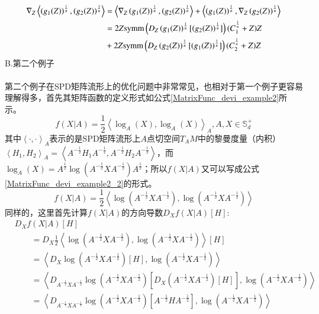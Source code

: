 \begin{equation}
\label{devi_power_metric_final}
\begin{split}
\nabla_{Z}\left<\left(g_{1}(Z)\right)^{\frac{1}{n}},\left(g_{2}(Z)\right)^{\frac{1}{n}}\right>&=\left<\nabla_{Z}\left(g_{1}(Z)\right)^{\frac{1}{n}},\left(g_{2}(Z)\right)^{\frac{1}{n}}\right>+\left<\left(g_{1}(Z)\right)^{\frac{1}{n}},\nabla_{Z}\left(g_{2}(Z)\right)^{\frac{1}{n}}\right>\\
&=2Z{\rm symm}\left(D_{Z}\left(g_{1}(Z)\right)^{\frac{1}{n}}[\left(g_{2}(Z)\right)^{\frac{1}{n}}]\right)(C_{1}^{\frac{1}{n}}+Z)Z\\
&+2Z{\rm symm}\left(D_{Z}\left(g_{2}(Z)\right)^{\frac{1}{n}}[\left(g_{1}(Z)\right)^{\frac{1}{n}}]\right)(C_{2}^{\frac{1}{n}}+Z)Z
\end{split}
\end{equation}
{\heiti B.第二个例子}\\\\
第二个例子在SPD矩阵流形上的优化问题中非常常见，也相对于第一个例子更容易理解得多，首先其矩阵函数的定义形式如公式\ref{MatrixFunc_devi_example2}所示。
\begin{equation}
\label{MatrixFunc_devi_example2}
f(X|A)=\frac{1}{2}\left<\log_{A}(X),\log_{A}(X)\right>_A,A,X\in \mathbb{S}_{d}^{+}
\end{equation}
其中$\left<\cdot,\cdot\right>_A$表示的是SPD矩阵流形上$A$点切空间$T_{A}M$中的黎曼度量（内积）$\left<H_1,H_2\right>_A=\left<A^{-\frac{1}{2}}H_1A^{-\frac{1}{2}},A^{-\frac{1}{2}}H_2A^{-\frac{1}{2}}\right>$，而$\log_A(X)=A^{\frac{1}{2}}\log(A^{-\frac{1}{2}}XA^{-\frac{1}{2}})A^{\frac{1}{2}}$；所以$f(X|A)$又可以写成公式\ref{MatrixFunc_devi_example2_2}的形式。
\begin{equation}
\label{MatrixFunc_devi_example2_2}
f(X|A)=\frac{1}{2}\left<\log(A^{-\frac{1}{2}}XA^{-\frac{1}{2}}),\log(A^{-\frac{1}{2}}XA^{-\frac{1}{2}})\right>
\end{equation}
同样的，这里首先计算$f(X|A)$的方向导数$D_{X}f(X|A)[H]$:
\begin{equation}
\label{AIM_CrossTerm_direction_devi}
\begin{split}
&D_{X}f(X|A)[H]\\
&~~~~~~~~~=D_{X}\frac{1}{2}\left<\log(A^{-\frac{1}{2}}XA^{-\frac{1}{2}}),\log(A^{-\frac{1}{2}}XA^{-\frac{1}{2}})\right>[H]\\
&~~~~~~~~~=\left<D_{X}\log(A^{-\frac{1}{2}}XA^{-\frac{1}{2}})[H],\log(A^{-\frac{1}{2}}XA^{-\frac{1}{2}})\right>\\
&~~~~~~~~~=\left<D_{A^{-\frac{1}{2}}XA^{-\frac{1}{2}}}\log(A^{-\frac{1}{2}}XA^{-\frac{1}{2}})[D_{X}(A^{-\frac{1}{2}}XA^{-\frac{1}{2}})[H]],\log(A^{-\frac{1}{2}}XA^{-\frac{1}{2}})\right>\\
&~~~~~~~~~=\left<D_{A^{-\frac{1}{2}}XA^{-\frac{1}{2}}}\log(A^{-\frac{1}{2}}XA^{-\frac{1}{2}})[A^{-\frac{1}{2}}HA^{-\frac{1}{2}}],\log(A^{-\frac{1}{2}}XA^{-\frac{1}{2}})\right>\\
\end{split}
\end{equation}
